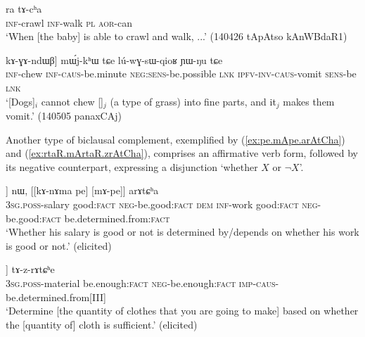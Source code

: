 \begin{exe}
\ex \label{ex:kAnWrtsW.kANke.ra.tAcha}
\gll [kɤ-nɯrtsɯ] [kɤ-ŋke] ra tɤ-cʰa \\
\textsc{inf}-crawl \textsc{inf}-walk \textsc{pl} \textsc{aor}-can \\
\glt `When [the baby] is able to crawl and walk, ...' (140426 tApAtso kAnWBdaR1)
\end{exe} 

\begin{exe}
\ex \label{ex:kAndza.kAGAndWB}
\gll [[kɤ-ndza] kɤ-ɣɤ-ndɯβ] mɯ́j-kʰɯ tɕe lú-wɣ-sɯ-qioʁ ɲɯ-ŋu tɕe \\
\textsc{inf}-chew \textsc{inf}-\textsc{caus}-be.minute \textsc{neg}:\textsc{sens}-be.possible \textsc{lnk} \textsc{ipfv}-\textsc{inv}-\textsc{caus}-vomit \textsc{sens}-be \textsc{lnk} \\
\glt `[Dogs]$_i$ cannot chew []$_j$ (a type of grass) into fine parts, and it$_j$ makes them vomit.' (140505 panaxCAj)
\end{exe} 

Another type of biclausal complement, exemplified by (\ref{ex:pe.mApe.arAtCha}) and (\ref{ex:rtaR.mArtaR.zrAtCha}), comprises an affirmative verb form, followed by its negative counterpart, expressing a disjunction `whether $X$ or $\lnot X$'.

\begin{exe} 
\ex \label{ex:pe.mApe.arAtCha}
\gll  [[ɯ-ngra pe] [mɤ-pe]] nɯ, [[kɤ-nɤma pe] [mɤ-pe]] arɤtɕʰa \\
\textsc{3sg}.\textsc{poss}-salary good:\textsc{fact} \textsc{neg}-be.good:\textsc{fact} \textsc{dem} \textsc{inf}-work good:\textsc{fact} \textsc{neg}-be.good:\textsc{fact} be.determined.from:\textsc{fact} \\
\glt `Whether his salary is good or not is determined by/depends on whether his work is good or not.' (elicited)
\end{exe} 

\begin{exe} 
\ex \label{ex:rtaR.mArtaR.zrAtCha}
\gll  [[ɯ-spa rtaʁ] [mɤ-rtaʁ]] tɤ-z-rɤtɕʰe \\
\textsc{3sg}.\textsc{poss}-material be.enough:\textsc{fact} \textsc{neg}-be.enough:\textsc{fact} \textsc{imp}-\textsc{caus}-be.determined.from[III] \\
\glt `Determine [the quantity of clothes that you are going to make] based on whether the [quantity of] cloth is sufficient.' (elicited)
\end{exe}

